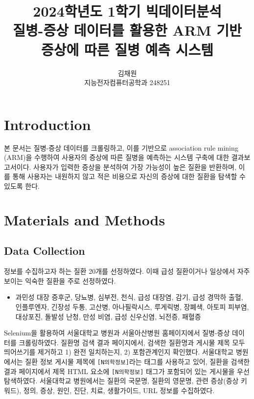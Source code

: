 \documentclass[conference]{IEEEtran}
\begin{document}
\title{
{\footnotesize 2024학년도 1학기 빅데이터분석 \\}
질병-증상 데이터를 활용한 ARM 기반\\증상에 따른 질병 예측 시스템\\
}

\author{김채원 \\
지능전자컴퓨터공학과 248251}

\maketitle

\section{Introduction}
본 문서는 질병-증상 데이터를 크롤링하고, 이를 기반으로 association rule mining (ARM)을 수행하여 사용자의 증상에 따른 질병을 예측하는 시스템 구축에 대한 결과보고서이다. 사용자가 입력한 증상을 분석하여 가장 가능성이 높은 질환을 반환하며, 이를 통해 사용자는 내원하지 않고 적은 비용으로 자신의 증상에 대한 질환을 탐색할 수 있도록 한다.

\section{Materials and Methods}

\subsection{Data Collection}
정보를 수집하고자 하는 질환 20개를 선정하였다. 이때 급성 질환이거나 일상에서 자주 보이는 익숙한 질환을 주로 선정하였다.
\begin{itemize}
    \item 과민성 대장 증후군, 당뇨병, 심부전, 천식, 급성 대장염, 감기, 급성 경막하 출혈, 인플루엔자, 긴장성 두통, 고산병, 아나필락시스, 루게릭병, 장폐색, 아토피 피부염, 대상포진, 돌발성 난청, 만성 비염, 급성 신우신염, 뇌전증, 패혈증
\end{itemize}

Selenium을 활용하여 서울대학교 병원과 서울아산병원 홈페이지에서 질병-증상 데이터를 크롤링하였다. 질환명 검색 결과 페이지에서, 검색한 질환명과 게시물 제목 모두 띄어쓰기를 제거하고 1) 완전 일치하는지, 2) 포함관계인지 확인했다. 서울대학교 병원에서는 질환 정보 게시물 제목에 \verb|[N의학정보]|라는 태그를 사용하고 있어, 질환을 검색한 결과 페이지에서 제목 HTML 요소에 \verb|[N의학정보]| 태그가 포함되어 있는 게시물을 우선 탐색하였다. 서울대학교 병원에서는 질환의 국문명, 질환의 영문명, 관련 증상(증상 키워드), 정의, 증상, 원인, 진단, 치료, 생활가이드, URL 정보를 수집하였다.
\end{document}
